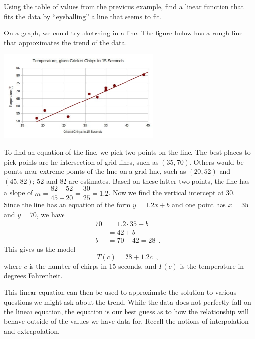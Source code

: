 \begin{example}
\label{ex:1-4-crickets}
Using the table of values from the previous example, find a linear function that fits the data by ``eyeballing'' a line that seems to fit.

\begin{solution} On a graph, we could try sketching in a line. The figure below has a rough line that approximates the trend of the data.
  \begin{center}
  \includegraphics[width = 0.6\textwidth]{img/chap1/sec1-4/1-4-crickets-plot-handline.jpg}
  \end{center}

To find an equation of the line, we pick two points on the line. The best places to pick points are he intersection of grid lines, such as $(35, 70)$. Others would be points near extreme points of the line on a grid line, such as $(20, 52)$ and $(45, 82)$; 52 and 82 are estimates. Based on these latter two points, the line has a slope of $m = \dfrac{82-52}{45-20} = \dfrac{30}{25} = 1.2$. Now we find the vertical intercept at 30. Since the line has an equation of the form $y = 1.2 x+b$ and one point has $x=35$ and $y=70$, we have
\begin{align*}
  70 &= 1.2\cdot 35 + b\\
  &= 42 + b\\
  b &= 70-42 = 28 \enspace .
\end{align*}
This gives us the model
$$T(c) = 28 + 1.2 c \enspace, $$
where $c$ is the number of chirps in 15 seconds, and $T(c)$ is the temperature in degrees Fahrenheit.
\end{solution}\end{example}

This linear equation can then be used to approximate the solution to various questions we might ask about the trend. While the data does not perfectly fall on the linear equation, the equation is our best guess as to how the relationship will behave outside of the values we have data for. Recall the notions of interpolation and extrapolation.

